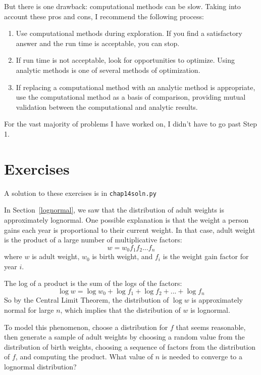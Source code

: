 But there is one drawback: computational methods can be slow.  Taking
into account these pros and cons, I recommend the following process:

\begin{enumerate}

\item Use computational methods during exploration.  If you find a
  satisfactory answer and the run time is acceptable, you can stop.

\item If run time is not acceptable, look for opportunities to
  optimize.  Using analytic methods is one of several methods of
  optimization.

\item If replacing a computational method with an analytic method is
  appropriate, use the computational method as a basis of comparison, 
  providing mutual validation between the computational and
  analytic results.

\end{enumerate}

For the vast majority of problems I have worked on, I didn't have
to go past Step 1.


\section{Exercises}

A solution to these exercises is in \verb"chap14soln.py"

\begin{exercise}
\label{log_clt}
In Section~\ref{lognormal}, we saw that the distribution
of adult weights is approximately lognormal.  One possible
explanation is that the weight a person
gains each year is proportional to their current weight.
In that case, adult weight is the product of a large number
of multiplicative factors:
%
\[ w = w_0 f_1 f_2 ... f_n  \]
%
where $w$ is adult weight, $w_0$ is birth weight, and $f_i$
is the weight gain factor for year $i$.

The log of a product is the sum of the logs of the
factors:
%
\[ \log w = \log w_0 + \log f_1 + \log f_2 + ... + \log f_n \]
%
So by the Central Limit Theorem, the distribution of $\log w$ is
approximately normal for large $n$, which implies that the
distribution of $w$ is lognormal.

To model this phenomenon, choose a distribution for $f$ that seems
reasonable, then generate a sample of adult weights by choosing a
random value from the distribution of birth weights, choosing a
sequence of factors from the distribution of $f$, and computing the
product.  What value of $n$ is needed to converge to a lognormal
distribution?


\end{exercise}



